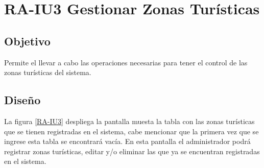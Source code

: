 \newpage
\section{RA-IU3 Gestionar Zonas Turísticas}

\subsection{Objetivo}
Permite el llevar a cabo las operaciones necesarias para tener el control de las zonas turísticas del sistema.

\subsection{Diseño}
La figura \ref{RA-IU3} despliega la pantalla  muesta la tabla con las zonas turísticas que se tienen registradas en el sistema, cabe mencionar que la primera vez que se ingrese esta tabla se encontrará vacía. En esta pantalla el administrador podrá registrar zonas turísticas, editar y/o eliminar las que ya se encuentran registradas en el sistema. 

